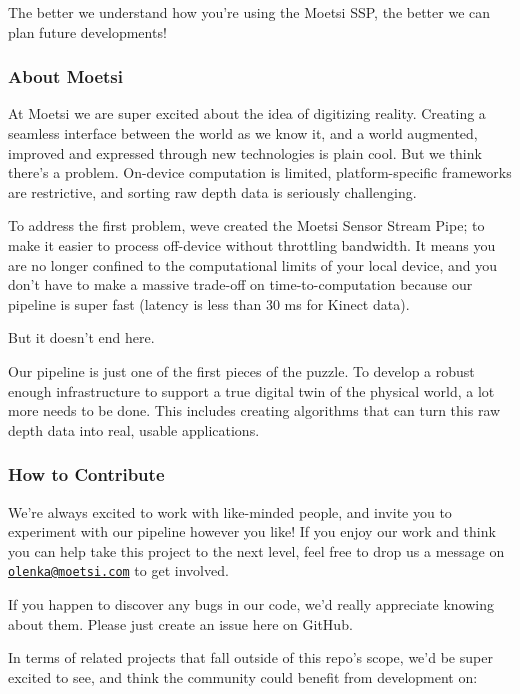 The better we understand how you’re using the Moetsi S\+SP, the better we can plan future developments!

\subsubsection*{About Moetsi}

At Moetsi we are super excited about the idea of digitizing reality. Creating a seamless interface between the world as we know it, and a world augmented, improved and expressed through new technologies is plain cool. But we think there’s a problem. On-\/device computation is limited, platform-\/specific frameworks are restrictive, and sorting raw depth data is seriously challenging.

To address the first problem, we\textquotesingle{}ve created the Moetsi Sensor Stream Pipe; to make it easier to process off-\/device without throttling bandwidth. It means you are no longer confined to the computational limits of your local device, and you don’t have to make a massive trade-\/off on time-\/to-\/computation because our pipeline is super fast (latency is less than 30 ms for Kinect data).

But it doesn’t end here.

Our pipeline is just one of the first pieces of the puzzle. To develop a robust enough infrastructure to support a true digital twin of the physical world, a lot more needs to be done. This includes creating algorithms that can turn this raw depth data into real, usable applications.

\subsubsection*{How to Contribute}

We’re always excited to work with like-\/minded people, and invite you to experiment with our pipeline however you like! If you enjoy our work and think you can help take this project to the next level, feel free to drop us a message on \href{mailto:olenka@moetsi.com}{\tt olenka@moetsi.\+com} to get involved.

If you happen to discover any bugs in our code, we’d really appreciate knowing about them. Please just create an issue here on Git\+Hub.

In terms of related projects that fall outside of this repo’s scope, we’d be super excited to see, and think the community could benefit from development on\+:

